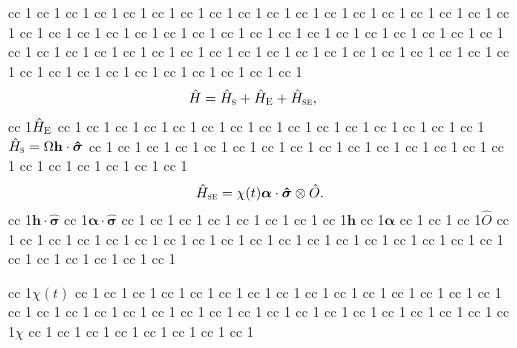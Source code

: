 \documentclass[11pt]{article}
\begin{document}
 cc 1  cc 1  cc 1  cc 1  cc 1  cc 1  cc 1  cc 1  cc 1  cc 1  cc 1  cc 1  cc 1  cc 1  cc 1  cc 1  cc 1  cc 1  cc 1  cc 1  cc 1  cc 1  cc 1  cc 1  cc 1  cc 1  cc 1  cc 1  cc 1  cc 1  cc 1  cc 1  cc 1  cc 1  cc 1  cc 1  cc 1  cc 1  cc 1  cc 1  cc 1  cc 1  cc 1  cc 1  cc 1  cc 1  cc 1  cc 1  cc 1  cc 1  cc 1  cc 1  cc 1  cc 1  cc 1  cc 1  cc 1  cc 1  cc 1  cc 1  cc 1  cc 1  cc 1
\begin{align}
\hat{H}&=\hat{H}_{\textsc{s}}+\hat{H}_{\textsc{E}}+\hat{H}_{\textsc{se}},
\end{align}
 cc 1$\hat{H}_{\textsc{E}}$ cc 1  cc 1  cc 1  cc 1  cc 1  cc 1  cc 1  cc 1  cc 1  cc 1  cc 1  cc 1  cc 1  cc 1  cc 1$\hat{H}_{\textsc{s}}=\Omega \mathbf{h}\cdot \bm{\hat{\sigma}}$ cc 1  cc 1  cc 1  cc 1  cc 1  cc 1  cc 1  cc 1  cc 1  cc 1  cc 1  cc 1  cc 1  cc 1  cc 1  cc 1  cc 1  cc 1  cc 1  cc 1  cc 1
\begin{equation}
    \hat{H}_{\textsc{se}}= \chi(t) \bm{\alpha}\cdot \bm{\hat{\sigma}} \otimes \hat{{O}}.
\end{equation}
 cc 1$\mathbf{h}\cdot \bm{\hat{\sigma}}$ cc 1$\bm{\alpha}\cdot \bm{\hat{\sigma}}$ cc 1  cc 1  cc 1  cc 1  cc 1  cc 1  cc 1  cc 1$\mathbf{h}$ cc 1$\bm{\alpha}$ cc 1  cc 1  cc 1$\hat{{O}}$ cc 1  cc 1  cc 1  cc 1  cc 1  cc 1  cc 1  cc 1  cc 1  cc 1  cc 1  cc 1  cc 1  cc 1  cc 1  cc 1  cc 1  cc 1  cc 1  cc 1  cc 1  cc 1  cc 1  cc 1

 cc 1$\chi(t)$ cc 1  cc 1  cc 1  cc 1  cc 1  cc 1  cc 1  cc 1  cc 1  cc 1  cc 1  cc 1  cc 1  cc 1  cc 1  cc 1  cc 1  cc 1  cc 1  cc 1  cc 1  cc 1  cc 1  cc 1  cc 1  cc 1  cc 1  cc 1  cc 1  cc 1  cc 1  cc 1  cc 1$\chi$ cc 1  cc 1  cc 1  cc 1  cc 1  cc 1  cc 1  cc 1
\end{document}
